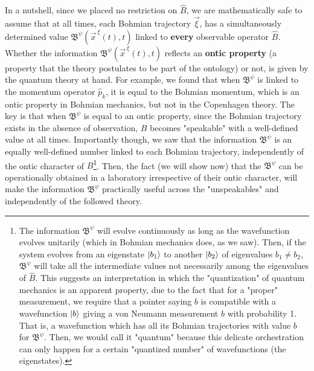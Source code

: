 \documentclass[11pt, a4paper]{article} %
\newcommand{\B}{\mathfrak{B}}
\begin{document}
In a nutshell, since we placed no restriction on $\hat{B}$, we are mathematically safe to assume that at all times, each Bohmian trajectory $\vec{\xi}$, has a simultaneously determined value $\B^\psi(\vec{x}^{\:\xi}(t),t)$ linked to {\bf every} observable operator $\hat{B}$. Whether the information $\B^\psi(\vec{x}^{\:\xi}(t),t)$ reflects an \textbf{ontic property} (a property that the theory postulates to be part of the ontology) or not, is given by the quantum theory at hand. For example, we found that when $\B^\psi$ is linked to the momentum operator $\hat{p}_k$, it is equal to the Bohmian momentum, which is an ontic property in Bohmian mechanics, but not in the Copenhagen theory. The key is that when $\B^\psi$ is equal to an ontic property, since the Bohmian trajectory exists in the absence of observation, $B$ becomes "speakable" with a well-defined value at all times. Importantly though, we saw that the information $\B^\psi$ is an equally well-defined number linked to each Bohmian trajectory, independently of the ontic character of $B$\footnote{The information $\B^\psi$ will evolve continuously as long as the wavefunction evolves unitarily (which in Bohmian mechanics does, as we saw). Then, if the system evolves from an eigenstate $\ket{b_1}$ to another $\ket{b_2}$ of eigenvalues $b_1\neq b_2$, $\B^\psi$ will take all the intermediate values not necessarily among the eigenvalues of $\hat{B}$. This suggests an interpretation in which the "quantization" of quantum mechanics is an apparent property, due to the fact that for a "proper" measurement, we require that a pointer saying $b$ is compatible with a wavefunction $\ket{b}$ giving a von Neumann measurement $b$ with probability 1. That is, a wavefunction which has all its Bohmian trajectories with value $b$ for $\B^\psi$. Then, we would call it "quantum" because this delicate orchestration can only happen for a certain "quantized number" of wavefunctions (the eigenstates).}. Then, the fact (we will show now) that the $\B^\psi$ can be operationally obtained in a laboratory irrespective of their ontic character, will make the information $\B^\psi$ practically useful across the "unspeakables" and independently of the followed theory.
\vspace{-0.75cm}
 
\end{document}
